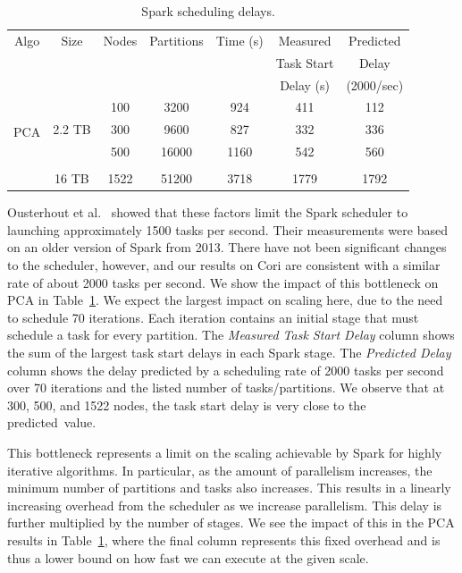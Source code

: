 \begin{table}[th]
\centering
\begin{tabular}{| c | c | c | c | c | c | c |}
\hline
Algo & Size & Nodes & Partitions & Time (s) & Measured & Predicted \\
{} & {} & {} & {} & {} & Task Start & Delay \\
{} & {} & {} & {} & {} & Delay (s) & (2000/sec) \\
\hline
\multirow{4}{*}{PCA} & \multirow{3}{*}{2.2 TB} & 100 & 3200 & 924 & 411 & 112 \\
 {} & {} & 300 & 9600 & 827 & 332 & 336 \\
 {} & {} & 500 & 16000 & 1160 & 542 & 560 \\ \cline{2-7} & & & & & & \\[-1ex]
 {} & {16 TB} & 1522 & 51200 & 3718 & 1779 & 1792 \\
 \hline
\end{tabular}
\caption{Spark scheduling delays.}
\label{tab:scheduling}
\end{table}

Ousterhout et al.~\cite{Ousterhout13Sparrow} showed that these factors limit the Spark scheduler to launching approximately 1500 tasks per second.  Their measurements were based on an older version of Spark from 2013.  There have not been significant changes to the scheduler, however, and our results on Cori are consistent with a similar rate of about 2000 tasks per second.  We show the impact of this bottleneck on PCA in Table~\ref{tab:scheduling}.  
We expect the largest impact on scaling here, due to the need to schedule 70 iterations.  Each iteration contains an initial stage that must schedule a task for every partition.  The \emph{Measured Task Start Delay} column shows the sum of the largest task start delays in each Spark stage.  The \emph{Predicted Delay} column shows the delay predicted by a scheduling rate of 2000 tasks per second over 70 iterations and the listed number of tasks/partitions.  We observe that at 300, 500, and 1522 nodes, the task start delay is very close to the predicted~value.%

This bottleneck represents a limit on the scaling achievable by Spark for highly iterative algorithms.  In particular, as the amount of parallelism increases, the minimum number of partitions and tasks also increases.  This results in a linearly increasing overhead from the scheduler as we increase parallelism.  This delay is further multiplied by the number of stages.  We see the impact of this in the PCA results in Table~\ref{tab:scheduling}, where the final column represents this fixed overhead and is thus a lower bound on how fast we can execute at the given scale.  


